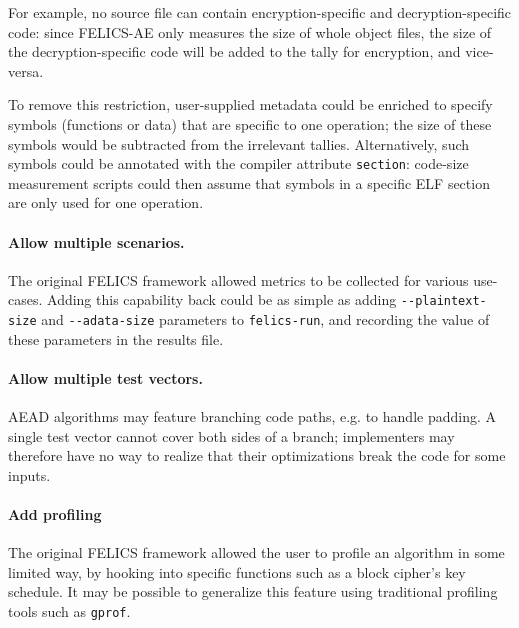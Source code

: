 \documentclass{article}
\begin{document}
For example, no source file can contain encryption-specific and
decryption-specific code: since FELICS-AE only measures the size of
whole object files, the size of the decryption-specific code will be
added to the tally for encryption, and vice-versa.

To remove this restriction, user-supplied metadata could be enriched
to specify symbols (functions or data) that are specific to one
operation; the size of these symbols would be subtracted from the
irrelevant tallies.  Alternatively, such symbols could be annotated
with the compiler attribute \texttt{section}: code-size measurement
scripts could then assume that symbols in a specific ELF section are
only used for one operation.

\paragraph{Allow multiple scenarios.}

The original FELICS framework allowed metrics to be collected for
various use-cases.  Adding this capability back could be as simple as
adding \texttt{-{}-plaintext-size} and \texttt{-{}-adata-size}
parameters to \texttt{felics-run}, and recording the value of these
parameters in the results file.

\paragraph{Allow multiple test vectors.}

AEAD algorithms may feature branching code paths, e.g. to handle
padding.  A single test vector cannot cover both sides of a branch;
implementers may therefore have no way to realize that their
optimizations break the code for some inputs.

\paragraph{Add profiling}

The original FELICS framework allowed the user to profile an algorithm
in some limited way, by hooking into specific functions such as a
block cipher's key schedule.  It may be possible to generalize this
feature using traditional profiling tools such as \texttt{gprof}.



\end{document}
